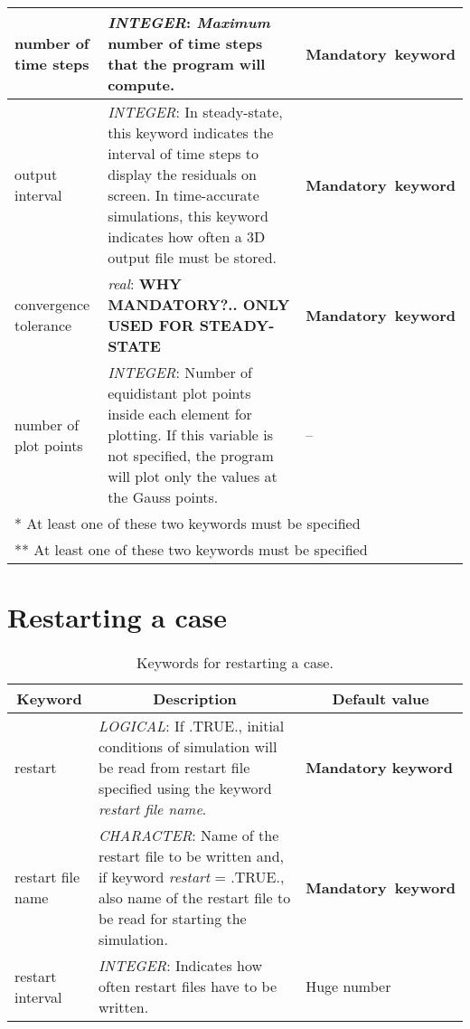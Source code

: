 \documentclass[a4paper,10pt]{report}
\begin{document}
\begin{table}[htbp]
\begin{tabular}{|l|p{10cm}|p{2.2cm}|}
number of time steps & \textit{INTEGER}: \textit{Maximum} number of time steps that the program will compute.  & \textbf{Mandatory\ keyword} \\ \hline

output interval   & \textit{INTEGER}: In steady-state, this keyword indicates the interval of time steps to display the residuals on screen. In time-accurate simulations, this keyword indicates how often a 3D output file must be stored.  & \textbf{Mandatory\ keyword} \\ \hline

convergence tolerance & \textit{real}: \textbf{WHY MANDATORY?.. ONLY USED FOR STEADY-STATE}  & \textbf{Mandatory\ keyword} \\ \hline

number of plot points & \textit{INTEGER}: Number of equidistant plot points inside each element for plotting. If this variable is not specified, the program will plot only the values at the Gauss points.  & -- \\ \hline

\multicolumn{3}{l}{*  At least one of these two keywords must be specified} \\

\multicolumn{3}{l}{** At least one of these two keywords must be specified}

\end{tabular}
\label{tab:runningkey}
\end{table}


\chapter{Restarting a case}

\begin{table}[htbp]
\caption{Keywords for restarting a case.}
\begin{tabular}{|l|p{10cm}|p{2.2cm}|}
\hline
\multicolumn{1}{|c|}{Keyword} & \multicolumn{1}{c|}{Description} & \multicolumn{1}{c|}{Default value} \\ \hline

restart 			& \textit{LOGICAL}: If .TRUE., initial conditions of simulation will be read from restart file specified using the keyword \textit{restart file name}. & \textbf{Mandatory keyword} \\ \hline

restart file name   & \textit{CHARACTER}: Name of the restart file to be written and, if keyword \textit{restart} = .TRUE., also name of the restart file to be read for starting the simulation. & \textbf{Mandatory\ keyword} \\ \hline

restart interval    & \textit{INTEGER}: Indicates how often restart files have to be written. & Huge number \\ \hline
\end{tabular}
\label{tab:restartkey}
\end{table}
\end{document}
